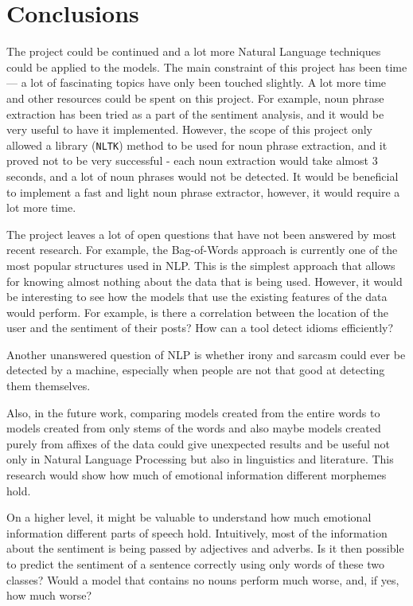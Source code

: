 \let\textcircled=\pgftextcircled
\chapter{Conclusions}
\label{chap:conclusions}

\par The project could be continued and a lot more Natural Language techniques could be applied to the models. The main constraint of this project has been time --- a lot of fascinating topics have only been touched slightly. A lot more time and other resources could be spent on this project. For example, noun phrase extraction has been tried as a part of the sentiment analysis, and it would be very useful to have it implemented. However, the scope of this project only allowed a library (\texttt{NLTK}) method to be used for noun phrase extraction, and it proved not to be very successful - each noun extraction would take almost 3 seconds, and a lot of noun phrases would not be detected. It would be beneficial to implement a fast and light noun phrase extractor, however, it would require a lot more time. 

The project leaves a lot of open questions that have not been answered by most recent research. For example, the Bag-of-Words approach is currently one of the most popular structures used in NLP. This is the simplest approach that allows for knowing almost nothing about the data that is being used. However, it would be interesting to see how the models that use the existing features of the data would perform. For example, is there a correlation between the location of the user and the sentiment of their posts? How can a tool detect idioms efficiently? 

Another unanswered question of NLP is whether irony and sarcasm could ever be detected by a machine, especially when people are not that good at detecting them themselves. 

Also, in the future work, comparing models created from the entire words to models created from only stems of the words and also maybe models created purely from affixes of the data could give unexpected results and be useful not only in Natural Language Processing but also in linguistics and literature. This research would show how much of emotional information different morphemes hold.

On a higher level, it might be valuable to understand how much emotional information different parts of speech hold. Intuitively, most of the information about the sentiment is being passed by adjectives and adverbs. Is it then possible to predict the sentiment of a sentence correctly using only words of these two classes? Would a model that contains no nouns perform much worse, and, if yes, how much worse?

